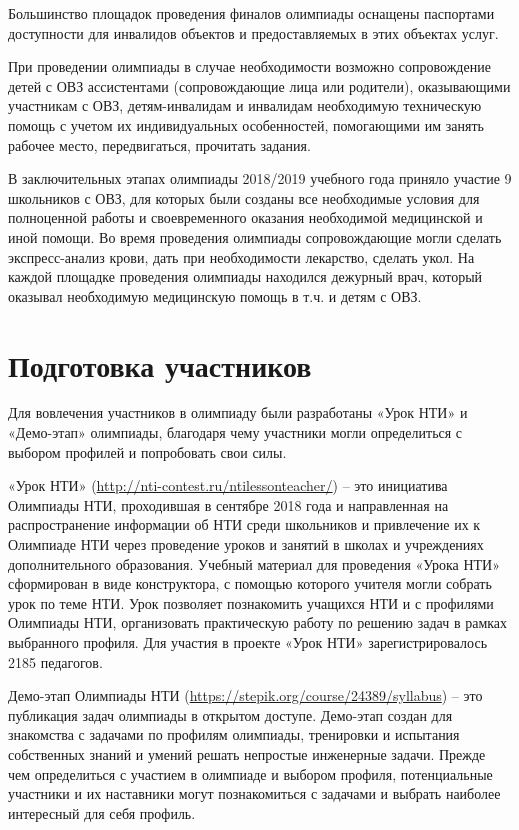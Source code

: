 Большинство площадок проведения финалов олимпиады оснащены паспортами доступности для инвалидов объектов и предоставляемых в этих объектах услуг.


При проведении олимпиады в случае необходимости возможно сопровождение детей с ОВЗ ассистентами (сопровождающие лица или родители), оказывающими участникам с ОВЗ, детям-инвалидам и инвалидам необходимую техническую помощь с учетом их индивидуальных особенностей, помогающими им занять рабочее место, передвигаться, прочитать задания. 

В заключительных этапах олимпиады 2018/2019 учебного года приняло участие 9 школьников с ОВЗ, для которых были созданы все необходимые условия для полноценной работы и своевременного оказания необходимой медицинской и иной помощи. Во время проведения олимпиады сопровождающие могли сделать экспресс-анализ крови, дать при необходимости лекарство, сделать укол. На каждой площадке проведения олимпиады находился дежурный врач, который оказывал необходимую медицинскую помощь в т.ч. и детям с ОВЗ.


\section*{Подготовка участников}

Для вовлечения участников в олимпиаду были разработаны «Урок НТИ» и «Демо-этап» олимпиады, благодаря чему участники могли определиться с выбором профилей и попробовать свои силы.

«Урок НТИ» (\url{http://nti-contest.ru/ntilessonteacher/}) – это инициатива Олимпиады НТИ, проходившая в сентябре 2018 года и направленная на распространение информации об НТИ среди школьников и привлечение их к Олимпиаде НТИ через проведение уроков и занятий в школах и учреждениях дополнительного образования. Учебный материал для проведения «Урока НТИ» сформирован в виде конструктора, с помощью которого учителя могли собрать урок по теме НТИ. Урок позволяет познакомить учащихся НТИ и  с профилями Олимпиады НТИ, организовать практическую работу по решению задач в рамках выбранного профиля. Для участия в проекте «Урок НТИ» зарегистрировалось 2185 педагогов.

Демо-этап Олимпиады НТИ (\url{https://stepik.org/course/24389/syllabus}) – это публикация задач олимпиады в открытом доступе. Демо-этап создан для знакомства с задачами по профилям олимпиады, тренировки и испытания собственных знаний и умений решать непростые инженерные задачи.  Прежде чем определиться с участием в олимпиаде и выбором профиля,  потенциальные участники и их наставники могут познакомиться с задачами и выбрать наиболее интересный для себя профиль.

